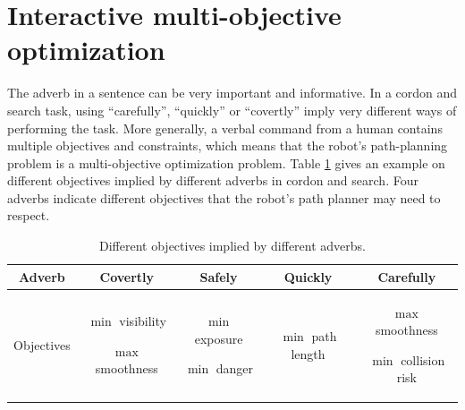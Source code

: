 \section{Interactive multi-objective optimization}
\label{sec:moo}

The adverb in a sentence can be very important and informative.
In a cordon and search task, using ``carefully'', ``quickly'' or ``covertly'' imply very different ways of performing the task. 
More generally, a verbal command from a human contains multiple objectives and constraints, which means that the robot's path-planning problem is a multi-objective optimization problem.
Table \ref{tab:adverbs} gives an example on different objectives implied by different adverbs in cordon and search. 
Four adverbs indicate different objectives that the robot's path planner may need to respect.

\begin{table}[h]
\caption{Different objectives implied by different adverbs.} 
\label{tab:adverbs}
\begin{center}  
\begin{tabular}{|c|c|c|c|c|}
\hline  
\rule[-1ex]{0pt}{3.5ex} Adverb & Covertly & Safely & Quickly & Carefully \\ 
\hline
\rule[-1ex]{0pt}{3.5ex} Objectives & 
\parbox{.18\linewidth}{
\begin{description}
\item $ \min $ visibility
\item $ \max $ smoothness
\end{description}  
} & 
\parbox{.18\linewidth}{
\begin{description}
\item $ \min $ exposure
\item $ \min $ danger
\end{description}  
}  & 
\parbox{.18\linewidth}{
\begin{description}
\item $ \min $ path length
\end{description}  
}  & 
\parbox{.18\linewidth}{
\begin{description}
\item $ \max $ smoothness
\item $ \min $ collision risk
\end{description}  
}   \\ 
\hline 
\end{tabular} 
\end{center}
\end{table} 

